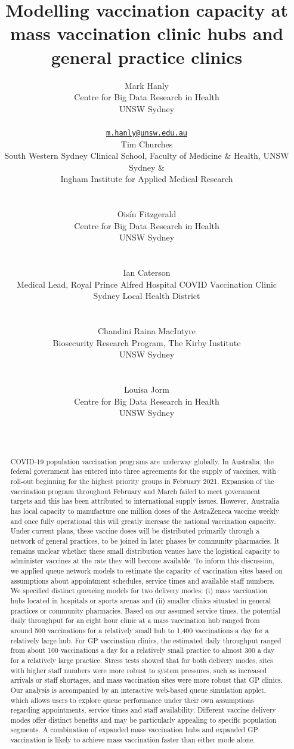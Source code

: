 \documentclass{article}
\title{Modelling vaccination capacity at mass vaccination clinic hubs and
general practice clinics}
\author{
    Mark Hanly
   \\
    Centre for Big Data Research in Health \\
    UNSW Sydney \\
   \\
  \texttt{\href{mailto:m.hanly@unsw.edu.au}{\nolinkurl{m.hanly@unsw.edu.au}}} \\
   \And
    Tim Churches
   \\
    South Western Sydney Clinical School, Faculty of Medicine \& Health,
  UNSW Sydney \& \\
    Ingham Institute for Applied Medical Research \\
   \\
  \texttt{} \\
   \And
    Oisín Fitzgerald
   \\
    Centre for Big Data Research in Health \\
    UNSW Sydney \\
   \\
  \texttt{} \\
   \And
    Ian Caterson
   \\
    Medical Lead, Royal Prince Alfred Hospital COVID Vaccination Clinic \\
    Sydney Local Health District \\
   \\
  \texttt{} \\
   \And
    Chandini Raina MacIntyre
   \\
    Biosecurity Research Program, The Kirby Institute \\
    UNSW Sydney \\
   \\
  \texttt{} \\
   \And
    Louisa Jorm
   \\
    Centre for Big Data Research in Health \\
    UNSW Sydney \\
   \\
  \texttt{} \\
  }
\begin{document}
\maketitle

\def\tightlist{}


\begin{abstract}
COVID-19 population vaccination programs are underway globally. In
Australia, the federal government has entered into three agreements for
the supply of vaccines, with roll-out beginning for the highest priority
groups in February 2021. Expansion of the vaccination program throughout
February and March failed to meet government targets and this has been
attributed to international supply issues. However, Australia has local
capacity to manufacture one million doses of the AstraZeneca vaccine
weekly and once fully operational this will greatly increase the
national vaccination capacity. Under current plans, these vaccine doses
will be distributed primarily through a network of general practices, to
be joined in later phases by community pharmacies. It remains unclear
whether these small distribution venues have the logistical capacity to
administer vaccines at the rate they will become available. To inform
this discussion, we applied queue network models to estimate the
capacity of vaccination sites based on assumptions about appointment
schedules, service times and available staff numbers. We specified
distinct queueing models for two delivery modes: (i) mass vaccination
hubs located in hospitals or sports arenas and (ii) smaller clinics
situated in general practices or community pharmacies. Based on our
assumed service times, the potential daily throughput for an eight hour
clinic at a mass vaccination hub ranged from around 500 vaccinations for
a relatively small hub to 1,400 vaccinations a day for a relatively
large hub. For GP vaccination clinics, the estimated daily throughput
ranged from about 100 vaccinations a day for a relatively small practice
to almost 300 a day for a relatively large practice. Stress tests showed
that for both delivery modes, sites with higher staff numbers were more
robust to system pressures, such as increased arrivals or staff
shortages, and mass vaccination sites were more robust that GP clinics.
Our analysis is accompanied by an interactive web-based queue simulation
applet, which allows users to explore queue performance under their own
assumptions regarding appointments, service times and staff
availability. Different vaccine delivery modes offer distinct benefits
and may be particularly appealing to specific population segments. A
combination of expanded mass vaccination hubs and expanded GP
vaccination is likely to achieve mass vaccination faster than either
mode alone.
\end{abstract}
\end{document}
